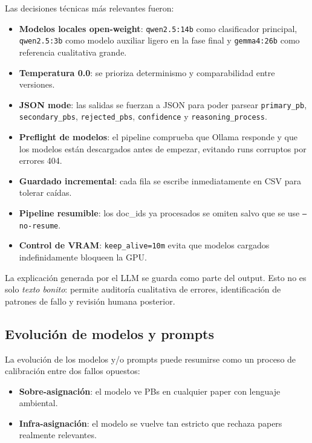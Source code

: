 Las decisiones técnicas más relevantes fueron:

\begin{itemize}
\item \textbf{Modelos locales open-weight}: \texttt{qwen2.5:14b} como clasificador principal, \texttt{qwen2.5:3b} como modelo auxiliar ligero en la fase final y \texttt{gemma4:26b} como referencia cualitativa grande.
\item \textbf{Temperatura 0.0}: se prioriza determinismo y comparabilidad entre versiones.
\item \textbf{JSON mode}: las salidas se fuerzan a JSON para poder parsear \texttt{primary\_pb}, \texttt{secondary\_pbs}, \texttt{rejected\_pbs}, \texttt{confidence} y \texttt{reasoning\_process}.
\item \textbf{Preflight de modelos}: el pipeline comprueba que Ollama responde y que los modelos están descargados antes de empezar, evitando runs corruptos por errores 404.
\item \textbf{Guardado incremental}: cada fila se escribe inmediatamente en CSV para tolerar caídas.
\item \textbf{Pipeline resumible}: los doc\_ids ya procesados se omiten salvo que se use \texttt{--no-resume}.
\item \textbf{Control de VRAM}: \texttt{keep\_alive=10m} evita que modelos cargados indefinidamente bloqueen la GPU.
\end{itemize}

La explicación generada por el LLM se guarda como parte del output. Esto no es solo \emph{texto bonito}: permite auditoría cualitativa de errores, identificación de patrones de fallo y revisión humana posterior.

\subsection{Evolución de modelos y prompts}

La evolución de los modelos y/o prompts puede resumirse como un proceso de calibración entre dos fallos opuestos:

\begin{itemize}
\item \textbf{Sobre-asignación}: el modelo ve PBs en cualquier paper con lenguaje ambiental.
\item \textbf{Infra-asignación}: el modelo se vuelve tan estricto que rechaza papers realmente relevantes.
\end{itemize}

